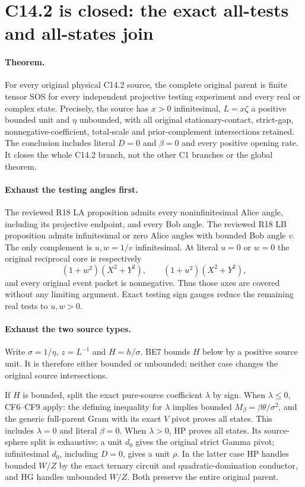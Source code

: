 \section{C14.2 is closed: the exact all-tests and all-states join}
\label{sec:r19-c142-complete}

\paragraph{Theorem.}
For every original physical C14.2 source, the complete original
parent is finite tensor SOS for every independent projective testing
experiment and every real or complex state.  Precisely, the source
has $x>0$ infinitesimal, $L=x\zeta$ a positive bounded unit and
$\eta$ unbounded, with all original stationary-contact, strict-gap,
nonnegative-coefficient, total-scale and prior-complement
intersections retained.  The conclusion includes literal $D=0$
and $\beta=0$ and every positive opening rate.  It closes the
whole C14.2 branch, not the other C1 branches or the global theorem.

\paragraph{Exhaust the testing angles first.}
The reviewed R18 LA proposition admits every noninfinitesimal
Alice angle, including its projective endpoint, and every Bob angle.
The reviewed R18 LB proposition admits infinitesimal or zero Alice
angles with bounded Bob angle $v$.  The only complement is
$u,w=1/v$ infinitesimal.  At literal $u=0$ or $w=0$ the original
reciprocal core is respectively
\[
 (1+w^2)(X^2+Y^2),\qquad (1+u^2)(X^2+Y^2),
\]
and every original event packet is nonnegative.  Thus those axes
are covered without any limiting argument.  Exact testing sign
gauges reduce the remaining real tests to $u,w>0$.

\paragraph{Exhaust the two source types.}
Write $\sigma=1/\eta$, $z=L^{-1}$ and $H=h/\sigma$.
BE7 bounds $H$ below by a positive source unit.  It is therefore
either bounded or unbounded; neither case changes the original
source intersections.

If $H$ is bounded, split the exact pure-source coefficient
$\lambda$ by sign.  When $\lambda\le0$, CF6--CF9 apply:
the defining inequality for $\lambda$ implies bounded
$M_\beta=\beta\theta/\sigma^2$, and the generic full-parent
Gram with its exact $V$ pivot proves all states.  This includes
$\lambda=0$ and literal $\beta=0$.
When $\lambda>0$, HP proves all states.  Its source-sphere split
is exhaustive: a unit $d_0$ gives the original strict Gamma pivot;
infinitesimal $d_0$, including $D=0$, gives a unit $\rho$.
In the latter case HP handles bounded $W/Z$ by the exact ternary
circuit and quadratic-domination conductor, and HG handles
unbounded $W/Z$.  Both preserve the entire original parent.

